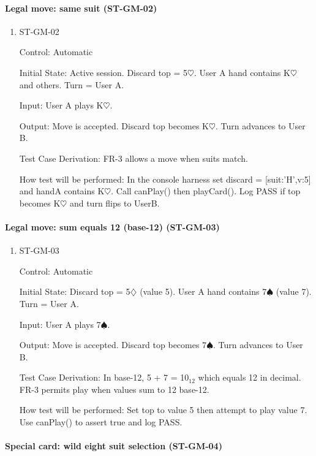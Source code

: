 \documentclass[12pt, titlepage]{article}
\begin{document}
\paragraph{Legal move: same suit (ST-GM-02)}

\begin{enumerate}
\item{ST-GM-02\\}

Control: Automatic
					
Initial State: Active session. Discard top = 5$\heartsuit$. User A hand contains K$\heartsuit$ and others. Turn = User A.
					
Input: User A plays K$\heartsuit$.
					
Output: Move is accepted. Discard top becomes K$\heartsuit$. Turn advances to User B.

Test Case Derivation: FR-3 allows a move when suits match.

How test will be performed: In the console harness set discard = [{suit:'H',v:5}] and handA contains K$\heartsuit$. Call canPlay() then playCard(). Log PASS if top becomes K$\heartsuit$ and turn flips to UserB.
\end{enumerate}

\paragraph{Legal move: sum equals 12 (base-12) (ST-GM-03)}

\begin{enumerate}
\item{ST-GM-03\\}

Control: Automatic
					
Initial State: Discard top = 5$\diamondsuit$ (value 5). User A hand contains 7$\spadesuit$ (value 7). Turn = User A.
					
Input: User A plays 7$\spadesuit$.
					
Output: Move is accepted. Discard top becomes 7$\spadesuit$. Turn advances to User B.

Test Case Derivation: In base-12, 5 + 7 = 10$_{12}$ which equals 12 in decimal. FR-3 permits play when values sum to 12 base-12.

How test will be performed: Set top to value 5 then attempt to play value 7. Use canPlay() to assert true and log PASS.
\end{enumerate}

\paragraph{Special card: wild eight suit selection (ST-GM-04)}
\end{document}
